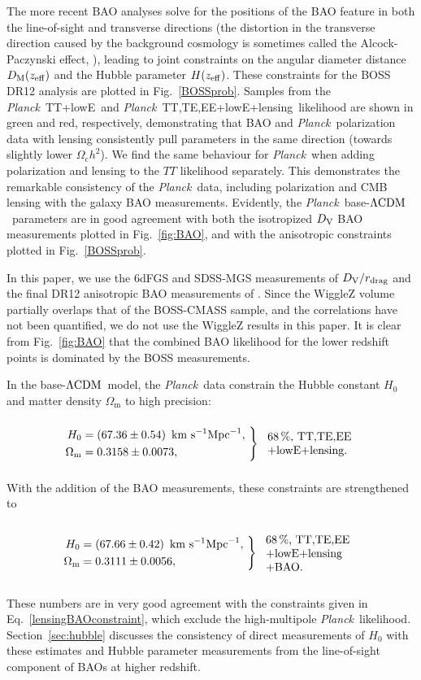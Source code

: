 \documentclass[longauth,traditabstract]{aa}
\def\Planck{\textit{Planck}}
\def\,{\thinspace}
\newcommand{\pbwidth}{4cm}
\newcommand{\leftparbox}[2]{\parbox{#1}{\begin{flushleft} #2 \end{flushleft}}}
\newcommand{\twoonesig}[4][\pbwidth]{
\begin{equation}
\left.
 \begin{aligned}
#2 \\ #3
 \end{aligned}
\ \right\} \ \ \mbox{\text{\leftparbox{#1}{68\,\%,~#4}}}
\end{equation}
}
\newcommand{\mksym}[1]{\ifmmode {\rm #1}\else #1\fi}
\newcommand{\dataplus}{\allowbreak+}
\newcommand{\BAO}{\mksym{BAO}}
\newcommand{\lensing}{\mksym{lensing}}
\newcommand{\TT}{\mksym{TT}}
\newcommand{\TTTEEE}{\mksym{TT,TE,EE}}
\newcommand{\planckTTonly}{\planck\ \TT}
\newcommand{\planckTTTEEEonly}{\planck\ \TTTEEE}
\newcommand{\lowE}{\mksym{lowE}}
\newcommand{\planckTT}{\planckTTonly\dataplus\lowE}
\newcommand{\planckall}{\planckTTTEEEonly\dataplus\lowE}
\newcommand{\planckalllensing}{\planckall\dataplus\lensing}
\newcommand{\shortpol}{\TTTEEE}
\newcommand{\rdrag}{r_{\rm drag}}
\newcommand{\DVBAO}{D_{\rm V}}
\newcommand{\DM}{D_{\rm M}}
\providecommand{\text}[1]{\rm{#1}}
\newcommand{\Mpc}{\text{Mpc}}
\newcommand{\Hunit}{~\text{km}~\text{s}^{-1} \Mpc^{-1}}
\providecommand{\Omc}{\Omega_{\mathrm{c}}}
\providecommand{\Omm}{\Omega_{\mathrm{m}}}
\providecommand{\LCDM}{{$\rm{\Lambda CDM}$}}
\newcommand{\planck}{\Planck}
\begin{document}
The more recent BAO analyses solve for the positions of
the BAO feature in both the line-of-sight and transverse directions (the
distortion in the transverse direction caused by the background cosmology
is sometimes called the Alcock-Paczynski effect, \citealt{Alcock:79}), leading
to joint constraints on the angular diameter distance $\DM(z_{\rm eff})$
and the Hubble parameter $H(z_{\rm eff})$.
These constraints for the BOSS DR12 analysis
are plotted in Fig.~\ref{BOSSprob}.  Samples from the \planckTT\ and \planckalllensing\
likelihood are shown in green and red, respectively, demonstrating that BAO and \planck\ polarization data with lensing
consistently pull parameters in the same direction (towards slightly lower $\Omc h^2$). We find
the same behaviour for \Planck\ when adding polarization and lensing to the $TT$ likelihood separately.
This demonstrates the remarkable consistency of the \Planck\ data, including polarization and CMB lensing
with the galaxy BAO measurements.
Evidently, the \Planck\ base-\LCDM\ parameters are in good agreement with both the
isotropized $\DVBAO$ BAO measurements plotted in Fig.~\ref{fig:BAO}, and with the anisotropic
constraints plotted in Fig.~\ref{BOSSprob}.

In this paper, we use the 6dFGS and SDSS-MGS
measurements of $\DVBAO/\rdrag$ \citep{Beutler:2011hx, Ross:2014qpa} and
the final DR12 anisotropic BAO measurements of
\citet{Alam:2016hwk}. Since the WiggleZ volume partially overlaps that of the
BOSS-CMASS sample, and the correlations have not been quantified, we do not
use the WiggleZ results in this paper. It is clear from Fig.~\ref{fig:BAO} that
the combined BAO likelihood for the lower redshift points is dominated by the BOSS measurements.

In the base-\LCDM\ model, the \Planck\ data constrain
the Hubble constant $H_0$ and matter density $\Omm$ to high precision:
\twoonesig[2.8cm]{H_0 &= (67.36 \pm 0.54) \, \Hunit,}{\Omm &=
 0.3158 \pm 0.0073,}{\shortpol\dataplus\lowE+\lensing.  \label{BAO_H01}}
With the addition of the BAO measurements, these constraints are strengthened
 to
\twoonesig[2.9cm]{H_0 &= (67.66 \pm 0.42) \, \Hunit,}{\Omm &= 0.3111 \pm 0.0056,}{\shortpol\dataplus\lowE+\lensing\dataplus\BAO. \label{BAO_H02}}
These numbers are in very good agreement with the constraints given in Eq.~\eqref{lensingBAOconstraint}, which exclude the high-multipole \Planck\ likelihood.
Section~\ref{sec:hubble} discusses the consistency of direct measurements of $H_0$ with these estimates and
Hubble parameter measurements from the line-of-sight component of BAOs at higher redshift.
\end{document}
